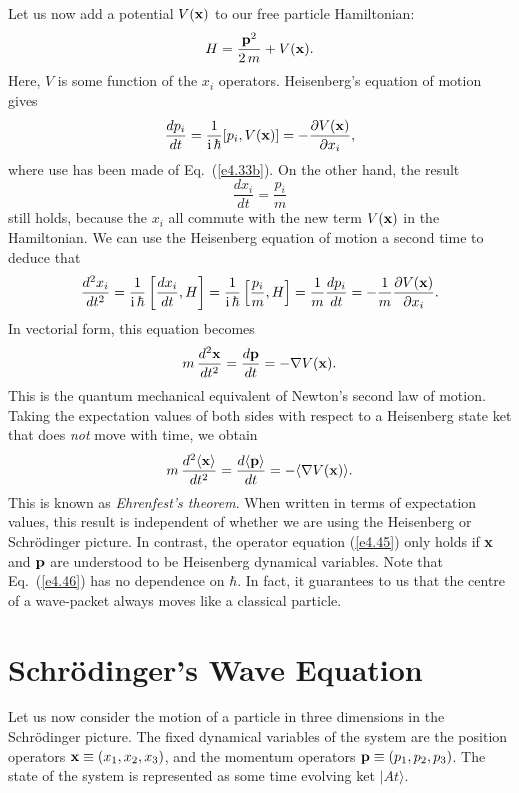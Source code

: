 Let us now add a potential $V({\bf x})$ to our free particle Hamiltonian:
\begin{equation}
H = \frac{{\bf p}^2}{2\,m} + V({\bf x}).
\end{equation}
Here, $V$ is some function of the $x_i$ operators. Heisenberg's equation of
motion gives
\begin{equation}
\frac{d p_i}{dt} = \frac{1}{{\rm i}\,\hbar} [p_i, V({\bf x})] = - \frac{\partial
V({\bf x})}{\partial x_i},
\end{equation}
where use has been made of Eq.~(\ref{e4.33b}). On the other hand, the result
\begin{equation}
\frac{d x_i}{dt} = \frac{p_i}{m}
\end{equation}
still holds, because the $x_i$ all commute with the new term $V({\bf x})$ in the
Hamiltonian. We can use the Heisenberg equation of motion a second time
to deduce that
\begin{equation}
\frac{d^2 x_i}{dt^2} = \frac{1}{{\rm i}\,\hbar} \left[\frac{dx_i}{dt}, H\right]
= \frac{1}{{\rm i}\,\hbar}\left[ \frac{p_i}{m}, H \right]
=\frac{1}{m}\frac{d p_i}{dt} = - \frac{1}{m} \frac{\partial V({\bf x})}{\partial x_i}.
\end{equation}
In vectorial form, this equation becomes
\begin{equation}\label{e4.45}
m\,\frac{d^2 {\bf x}}{d t^2} = \frac{d{\bf p}}{dt} =
- \nabla V({\bf x}).
\end{equation}
This is the quantum mechanical equivalent of Newton's second law of motion.
Taking the expectation values of both sides with respect to a Heisenberg
state ket that does {\em not}\/ move with time, we obtain
\begin{equation}\label{e4.46}
m \,\frac{d^2\langle {\bf x}\rangle}{dt^2}= \frac{d\langle{\bf p}\rangle}{dt}
= - \langle \nabla V({\bf x})\rangle.
\end{equation}
This is known as {\em Ehrenfest's theorem}. When written in terms of expectation
values, this result is independent of whether we are using the Heisenberg or
Schr\"{o}dinger picture. In contrast, the operator equation (\ref{e4.45}) only holds
if ${\bf x}$ and ${\bf p}$ are understood to be Heisenberg dynamical variables.
Note that Eq.~(\ref{e4.46}) has no dependence on $\hbar$. 
In fact, it guarantees to  us that the centre of
a wave-packet always moves like a classical particle.

\section{Schr\"{o}dinger's Wave Equation}
Let us now consider the motion of a particle 
in three dimensions in the Schr\"{o}dinger picture. The fixed dynamical variables of
the system are the position operators ${\bf x}\equiv
(x_1, x_2, x_3)$, and the momentum operators ${\bf p}\equiv (p_1, p_2, p_3)$.
The state of the system is represented as some time evolving ket $|At\rangle$.

